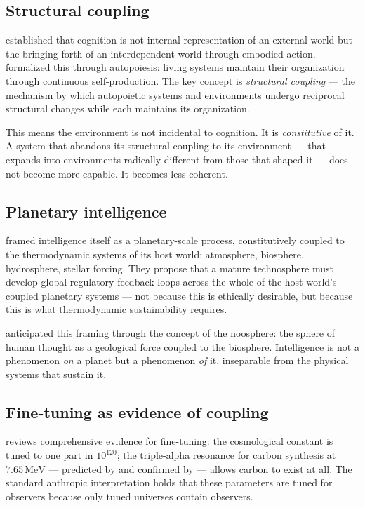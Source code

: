 \documentclass[12pt, a4paper]{article}
\begin{document}
\subsection{Structural coupling}

\citet{varela1991} established that cognition is not internal representation of an external
world but the bringing forth of an interdependent world through embodied action.
\citet{maturana1980} formalized this through autopoiesis: living systems maintain their
organization through continuous self-production. The key concept is \textit{structural
coupling} --- the mechanism by which autopoietic systems and environments undergo reciprocal
structural changes while each maintains its organization.

This means the environment is not incidental to cognition. It is \textit{constitutive} of
it. A system that abandons its structural coupling to its environment --- that expands into
environments radically different from those that shaped it --- does not become more capable.
It becomes less coherent.

\subsection{Planetary intelligence}

\citet{frank2022} framed intelligence itself as a planetary-scale process, constitutively
coupled to the thermodynamic systems of its host world: atmosphere, biosphere, hydrosphere,
stellar forcing. They propose that a mature technosphere must develop global regulatory
feedback loops across the whole of the host world's coupled planetary systems --- not because
this is ethically desirable, but because this is what thermodynamic sustainability requires.

\citet{vernadsky1998} anticipated this framing through the concept of the noosphere: the
sphere of human thought as a geological force coupled to the biosphere. Intelligence is not a
phenomenon \textit{on} a planet but a phenomenon \textit{of} it, inseparable from the
physical systems that sustain it.

\subsection{Fine-tuning as evidence of coupling}

\citet{barnes2012} reviews comprehensive evidence for fine-tuning: the cosmological constant
is tuned to one part in $10^{120}$; the triple-alpha resonance for carbon synthesis at
$7.65\,\mathrm{MeV}$ --- predicted by \citet{hoyle1953} and confirmed by
\citet{oberhummer2000} --- allows carbon to exist at all. The standard anthropic
interpretation holds that these parameters are tuned for observers because only tuned
universes contain observers.
\end{document}
